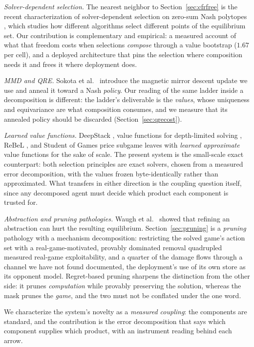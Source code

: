 \documentclass[11pt]{article}
\theoremstyle{plain}
\theoremstyle{definition}
\theoremstyle{remark}
\begin{document}
\emph{Solver-dependent selection.} The nearest neighbor to
Section~\ref{sec:cfrfree} is the recent characterization of
solver-dependent selection on zero-sum Nash polytopes
\cite{nashselect}, which studies how different algorithms select
different points of the equilibrium set. Our contribution is
complementary and empirical: a measured account of what that freedom
costs when selections \emph{compose} through a value bootstrap
($1.67$ per cell), and a deployed architecture that pins the selection
where composition needs it and frees it where deployment does.

\emph{MMD and QRE.} Sokota et al.\ \cite{sokota2022} introduce the
magnetic mirror descent update we use and anneal it toward a Nash
\emph{policy}. Our reading of the same ladder inside a decomposition is
different: the ladder's deliverable is the \emph{values}, whose
uniqueness and equivariance are what composition consumes, and we
measure that its annealed policy should be discarded
(Section~\ref{sec:qrecost}).

\emph{Learned value functions.} DeepStack \cite{deepstack}, value
functions for depth-limited solving \cite{kovarik2019}, ReBeL
\cite{rebel}, and Student of Games \cite{sog} price subgame leaves with
\emph{learned approximate} value functions for the sake of scale. The
present system is the small-scale exact counterpart: both selection
principles are exact solvers, chosen from a measured error
decomposition, with the values frozen byte-identically rather than
approximated. What transfers in either direction is the coupling
question itself, since any decomposed agent must decide which product
each component is trusted for.

\emph{Abstraction and pruning pathologies.} Waugh et al.\
\cite{waugh2009} showed that refining an abstraction can hurt the
resulting equilibrium. Section~\ref{sec:pruning} is a \emph{pruning}
pathology with a mechanism decomposition: restricting the solved game's
action set with a real-game-motivated, provably dominated removal
quadrupled measured real-game exploitability, and a quarter of the
damage flows through a channel we have not found documented, the
deployment's use of its own store as its opponent model. Regret-based
pruning \cite{brownsandholm2015} sharpens the distinction from the
other side: it prunes \emph{computation} while provably preserving the
solution, whereas the mask prunes the \emph{game}, and the two must not
be conflated under the one word.

We characterize the system's novelty as a \emph{measured coupling}: the
components are standard, and the contribution is the error
decomposition that says which component supplies which product, with an
instrument reading behind each arrow.
\end{document}
